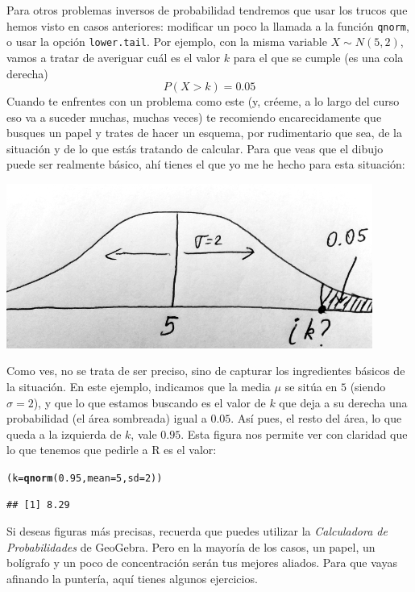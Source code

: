 \documentclass[10pt,a4paper]{article}\usepackage[]{graphicx}\usepackage[]{color}
\makeatletter
\newcommand{\hlnum}[1]{\textcolor[rgb]{0.686,0.059,0.569}{#1}}%
\newcommand{\hlstd}[1]{\textcolor[rgb]{0.345,0.345,0.345}{#1}}%
\newcommand{\hlkwb}[1]{\textcolor[rgb]{0.69,0.353,0.396}{#1}}%
\newcommand{\hlkwc}[1]{\textcolor[rgb]{0.333,0.667,0.333}{#1}}%
\newcommand{\hlkwd}[1]{\textcolor[rgb]{0.737,0.353,0.396}{\textbf{#1}}}%
\newenvironment{kframe}{%
 \def\at@end@of@kframe{}%
 \ifinner\ifhmode%
  \def\at@end@of@kframe{\end{minipage}}%
  \begin{minipage}{\columnwidth}%
 \fi\fi%
 \def\FrameCommand##1{\hskip\@totalleftmargin \hskip-\fboxsep
 \colorbox{shadecolor}{##1}\hskip-\fboxsep
     \hskip-\linewidth \hskip-\@totalleftmargin \hskip\columnwidth}%
 \MakeFramed {\advance\hsize-\width
   \@totalleftmargin\z@ \linewidth\hsize
   \@setminipage}}%
 {\par\unskip\endMakeFramed%
 \at@end@of@kframe}
\newenvironment{knitrout}{}{} %
\makeatother
\begin{document}
Para otros problemas inversos de probabilidad tendremos que usar los trucos que hemos visto en casos anteriores: modificar un poco la llamada a la función {\tt qnorm}, o usar la opción {\tt lower.tail}. Por ejemplo, con la misma variable $X\sim N(5,2)$, vamos a tratar de averiguar cuál es el valor $k$ para el que se cumple (es una cola derecha)
    \[
    P(X>k)=0.05
    \]
Cuando te enfrentes con un problema como este (y, créeme, a lo largo del curso eso va  a suceder muchas, muchas veces) te recomiendo encarecidamente que busques un papel y trates de hacer un esquema, por rudimentario que sea, de la situación y de lo que estás tratando de calcular. Para que veas que el dibujo puede ser realmente básico, ahí tienes el que yo me he hecho para esta situación:
\begin{center}
\includegraphics[width=12cm]{../fig/Tut05-67.png}
\end{center}
Como ves, no se trata de ser preciso, sino de capturar los ingredientes básicos de la situación. En este ejemplo, indicamos que la media $\mu$ se sitúa en $5$ (siendo $\sigma = 2$), y que lo que estamos buscando es el valor de $k$ que deja a su derecha una probabilidad (el área sombreada) igual a $0.05$. Así pues, el resto del área, lo que queda a la izquierda de $k$, vale $0.95$. Esta figura nos permite ver con claridad que lo que tenemos que pedirle a R es el valor:
\begin{knitrout}
\color{fgcolor}\begin{kframe}
\begin{alltt}
\hlstd{(k} \hlkwb{=} \hlkwd{qnorm}\hlstd{(}\hlnum{0.95}\hlstd{,} \hlkwc{mean}\hlstd{=}\hlnum{5}\hlstd{,} \hlkwc{sd}\hlstd{=}\hlnum{2}\hlstd{))}
\end{alltt}
\begin{verbatim}
## [1] 8.29
\end{verbatim}
\end{kframe}
\end{knitrout}
Si deseas figuras más precisas, recuerda que puedes utilizar la {\em Calculadora de Probabilidades} de GeoGebra. Pero en la mayoría de los casos, un papel, un bolígrafo y un poco de concentración serán tus mejores aliados. Para que vayas afinando la puntería, aquí tienes algunos ejercicios.
\end{document}
